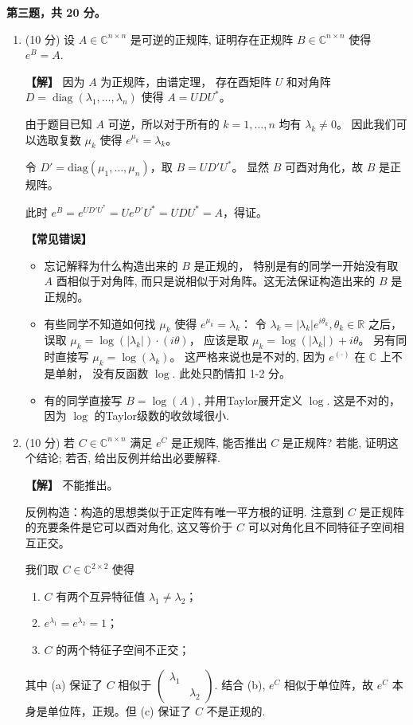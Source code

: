 \textbf{第三题，共 20 分。}
\begin{enumerate}
\item (10 分) 设 $A\in\mathbb{C}^{n\times n}$ 是可逆的正规阵, 
证明存在正规阵 $B\in\mathbb{C}^{n\times n}$ 使得 $e^B=A$.

\textbf{【解】} 因为 $A$ 为正规阵，由谱定理，
存在酉矩阵 $U$ 和对角阵 $D=\operatorname{diag}(\lambda_1,\dots,\lambda_n)$ 使得 $A=UDU^*$。

由于题目已知 $A$ 可逆，所以对于所有的 $k=1,\dots,n$ 均有 $\lambda_k\neq0$。
因此我们可以选取复数 $\mu_k$ 使得 $e^{\mu_k}=\lambda_k$。

令 $D'=\mathrm{diag}(\mu_1,\dots,\mu_n)$，取 $B=UD'U^*$。
显然 $B$ 可酉对角化，故 $B$ 是正规阵。

此时 $e^B=e^{UD'U^*}=Ue^{D'}U^*=UDU^*=A$，得证。

\textbf{【常见错误】}
\begin{itemize}
\item 忘记解释为什么构造出来的 $B$ 是正规的，
特别是有的同学一开始没有取 $A$ 酉相似于对角阵, 
而只是说相似于对角阵。这无法保证构造出来的 $B$ 是正规的。
\item 有些同学不知道如何找 $\mu_k$ 使得 $e^{\mu_k}=\lambda_k$：
令 $\lambda_k=|\lambda_k|e^{i\theta_k},\theta_k\in\mathbb{R}$ 之后，
误取 $\mu_k=\log(|\lambda_k|)\cdot(i\theta)$，
应该是取 $\mu_k=\log(|\lambda_k|)+i\theta$。
另有同时直接写 $\mu_k=\log(\lambda_k)$。
这严格来说也是不对的, 因为 $e^{(\cdot)}$ 在 $\mathbb{C}$ 上不是单射，
没有反函数 $\log$. 此处只酌情扣 1-2 分。
\item 有的同学直接写 $B=\log(A)$, 并用Taylor展开定义 $\log$. 
这是不对的，因为 $\log$ 的Taylor级数的收敛域很小.
\end{itemize}

\item (10 分) 若 $C\in\mathbb{C}^{n\times n}$ 满足 $e^C$ 是正规阵, 
能否推出 $C$ 是正规阵? 若能, 证明这个结论; 若否, 给出反例并给出必要解释.

\textbf{【解】} 不能推出。

反例构造：构造的思想类似于正定阵有唯一平方根的证明. 
注意到 $C$ 是正规阵的充要条件是它可以酉对角化, 
这又等价于 $C$ 可以对角化且不同特征子空间相互正交。

我们取 $C\in\mathbb{C}^{2\times2}$ 使得
\begin{enumerate}[label=(\alph*)]
\item $C$ 有两个互异特征值 $\lambda_1\neq\lambda_2$；
\item $e^{\lambda_1}=e^{\lambda_2}=1$；
\item $C$ 的两个特征子空间不正交；
\end{enumerate}
其中 (a) 保证了 $C$ 相似于 $\begin{pmatrix}\lambda_1&\\&\lambda_2\end{pmatrix}$. 
结合 (b), $e^C$ 相似于单位阵，故 $e^C$ 本身是单位阵，正规。但 (c) 保证了 $C$ 不是正规的.


\end{enumerate}
